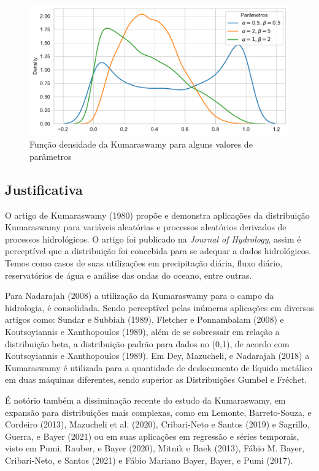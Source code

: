 \documentclass[
]{article}
\begin{document}
\begin{figure}

{\centering \includegraphics{report_files/figure-pdf/fig-plt-output-1.pdf}

}

\caption{\label{fig-plt}Função densidade da Kumaraswamy para alguns
valores de parâmetros}

\end{figure}

\subsection{Justificativa}

O artigo de Kumaraswamy (1980) propõe e demonstra aplicações da
distribuição Kumaraswamy para variáveis aleatórias e processos
aleatórios derivados de processos hidrológicos. O artigo foi publicado
na \emph{Journal of Hydrology}, assim é perceptível que a distribuição
foi concebida para se adequar a dados hidrológicos. Temos como casos de
suas utilizações em precipitação diária, fluxo diário, reservatórios de
água e análise das ondas do oceano, entre outras.

Para Nadarajah (2008) a utilização da Kumaraswamy para o campo da
hidrologia, é consolidada. Sendo perceptível pelas inúmeras aplicações
em diversos artigos como: Sundar e Subbiah (1989), Fletcher e
Ponnambalam (2008) e Koutsoyiannis e Xanthopoulos (1989), além de se
sobressair em relação a distribuição beta, a distribuição padrão para
dados no (0,1), de acordo com Koutsoyiannis e Xanthopoulos (1989). Em
Dey, Mazucheli, e Nadarajah (2018) a Kumaraswamy é utilizada para a
quantidade de deslocamento de líquido metálico em duas máquinas
diferentes, sendo superior as Distribuições Gumbel e Fréchet.

É notório também a dissiminação recente do estudo da Kumaraswamy, em
expansão para distribuições mais complexas, como em Lemonte,
Barreto-Souza, e Cordeiro (2013), Mazucheli et al. (2020), Cribari-Neto
e Santos (2019) e Sagrillo, Guerra, e Bayer (2021) ou em suas aplicações
em regressão e séries temporais, visto em Pumi, Rauber, e Bayer (2020),
Mitnik e Baek (2013), Fábio M. Bayer, Cribari-Neto, e Santos (2021) e
Fábio Mariano Bayer, Bayer, e Pumi (2017).
\end{document}
